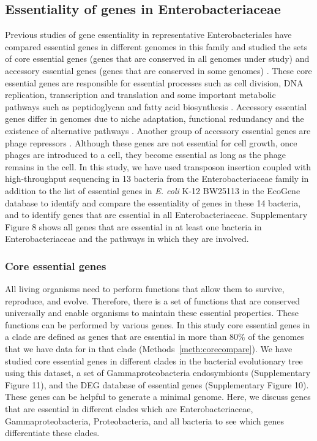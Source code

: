 \documentclass[12pt,letterpaper]{article}
\begin{document}
\subsection{Essentiality of genes in Enterobacteriaceae}
Previous studies of gene essentiality in representative Enterobacteriales have compared essential genes in different genomes in this family and studied the sets of core essential genes (genes that are conserved in all genomes under study) and accessory essential genes (genes that are conserved in some genomes) \cite{canals_high-throughput_2012, barquist_comparison_2013, freed_combining_2016}. These core essential genes are responsible for essential processes such as cell division, DNA replication, transcription and translation and some important metabolic pathways such as peptidoglycan and fatty acid biosynthesis \cite{barquist_comparison_2013}. Accessory essential genes differ in genomes due to niche adaptation, functional redundancy and the existence of alternative pathways \cite{canals_high-throughput_2012, bergmiller_patterns_2012, barquist_comparison_2013, freed_combining_2016}. Another group of accessory essential genes are phage repressors \cite{barquist_comparison_2013}. Although these genes are not essential for cell growth, once phages are introduced to a cell, they become essential as long as the phage remains in the cell. In this study, we have used transposon insertion coupled with high-throughput sequencing in 13 bacteria from the Enterobacteriaceae family in addition to the list of essential genes in \textit{E. coli} K-12 BW25113 in the EcoGene database \cite{zhou_ecogene_2013} to identify and compare the essentiality of genes in these 14 bacteria, and to identify genes that are essential in all Enterobacteriaceae. Supplementary Figure 8 shows all genes that are essential in at least one bacteria in Enterobacteriaceae and the pathways in which they are involved.
\subsubsection{Core essential genes}
All living organisms need to perform functions that allow them to survive, reproduce, and evolve. Therefore, there is a set of functions that are conserved universally and enable organisms to maintain these essential properties. These functions can be performed by various genes. In this study core essential genes in a clade are defined as genes that are essential in more than $80\%$ of the genomes that we have data for in that clade (Methods~\ref{meth:corecompare}). We have studied core essential genes in different clades in the bacterial evolutionary tree using this dataset, a set of Gammaproteobacteria endosymbionts (Supplementary Figure 11), and the DEG database of essential genes (Supplementary Figure 10). These genes can be helpful to generate a minimal genome. Here, we discuss genes that are essential in different clades which are Enterobacteriaceae, Gammaproteobacteria, Proteobacteria, and all bacteria to see which genes differentiate these clades.
\end{document}
